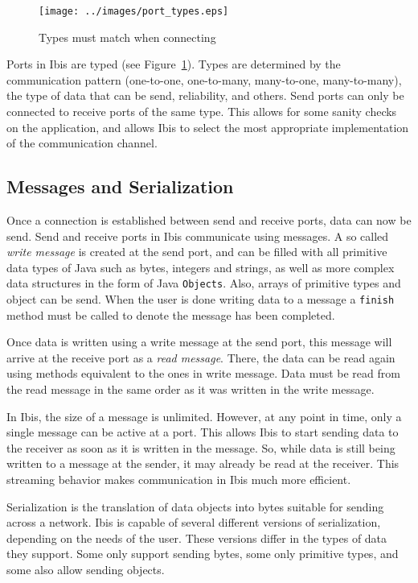 \documentclass[10pt]{article}
\begin{document}
\begin{figure} \centering
\texttt{[image: ../images/port\_types.eps]}
\caption{\label{port_types}Types must match when connecting} 
\end{figure}

Ports in Ibis are typed (see Figure~\ref{port_types}). Types are
determined by the communication pattern (one-to-one, one-to-many,
many-to-one, many-to-many), the type of data that can be send,
reliability, and others. Send ports can only be connected to receive
ports of the same type. This allows for some sanity checks on the
application, and allows Ibis to select the most appropriate
implementation of the communication channel.

\subsection{Messages and Serialization}


Once a connection is established between send and receive ports, data
can now be send. Send and receive ports in Ibis communicate using
messages. A so called \emph{write message} is created at the send port,
and can be filled with all primitive data types of Java such as bytes, integers
and strings, as well as more complex data structures in the form of
Java \texttt{Objects}. Also, arrays of primitive types and object can be
send. When the user is done writing data to a message a \texttt{finish}
method must be called to denote the message has been completed.

Once data is written using a write message at the send port, this
message will arrive at the receive port as a \emph{read message}. There,
the data can be read again using methods equivalent to the ones in
write message. Data must be read from the read message in the same order
as it was written in the write message.

In Ibis, the size of a message is unlimited. However, at any point in
time, only a single message can be active at a port. This allows Ibis to
start sending data to the receiver as soon as it is written in the
message. So, while data is still being written to a message at the
sender, it may already be read at the receiver. This streaming behavior
makes communication in Ibis much more efficient.

Serialization is the translation of data objects into bytes suitable for
sending across a network. Ibis is capable of several different versions
of serialization, depending on the needs of the user. These versions
differ in the types of data they support. Some only support sending
bytes, some only primitive types, and some also allow sending objects.
\end{document}

